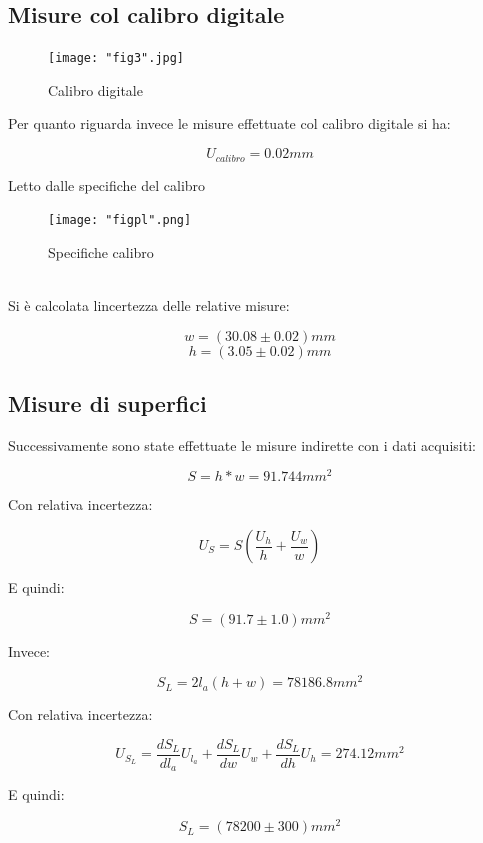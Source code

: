 \documentclass[a4paper]{article}
\begin{document}
\subsection{Misure col calibro digitale}
\begin{figure}[htp]
	\centering
	\texttt{[image: "fig3".jpg]}
	\caption{Calibro digitale}
	\label{}
\end{figure}
Per quanto riguarda invece le misure effettuate col calibro digitale si ha: 
\begin{Large} 
	\begin{equation}
		U_{calibro}  = 0.02mm
	 \end{equation}
\end{Large}
Letto dalle specifiche del calibro
\begin{figure}[htp]
	\centering
	\texttt{[image: "figpl".png]}
	\caption{Specifiche calibro}
	\label{}
\end{figure}
\\Si è calcolata lincertezza delle relative misure: 
\begin{Large} 
	\begin{equation}
		w = (30.08\pm0.02)mm
	 \end{equation}
	 \begin{equation}
		h = (3.05\pm0.02)mm
	 \end{equation}
\end{Large}
\subsection{Misure di superfici}
Successivamente sono state effettuate le misure indirette con i dati acquisiti:
\begin{Large} 
	\begin{equation}
		S = h*w = 91.744 mm^2
	 \end{equation}
\end{Large}
Con relativa incertezza:
\begin{Large} 
	\begin{equation}
		U_{S} =S(\frac{U_h}{h}+\frac{U_w}{w})
	 \end{equation}
\end{Large}
E quindi: 
\begin{Large} 
	\begin{equation}
		S =(91.7\pm 1.0)mm^2
	 \end{equation}
\end{Large}
Invece:
\begin{Large} 
	\begin{equation}
		S_L= 2l_a(h+w) = 78186.8 mm^2
	 \end{equation}
\end{Large}
Con relativa incertezza:
\begin{Large} 
	\begin{equation}
		U_{S_L} =\frac{dS_L}{dl_a}U_{l_a}+\frac{dS_L}{dw}U_w+\frac{dS_L}{dh}U_h=274.12 mm^2
	 \end{equation}
\end{Large}
E quindi: 
\begin{Large} 
	\begin{equation}
		S_L =(78200\pm 300)mm^2
	 \end{equation}
\end{Large}
\end{document}
